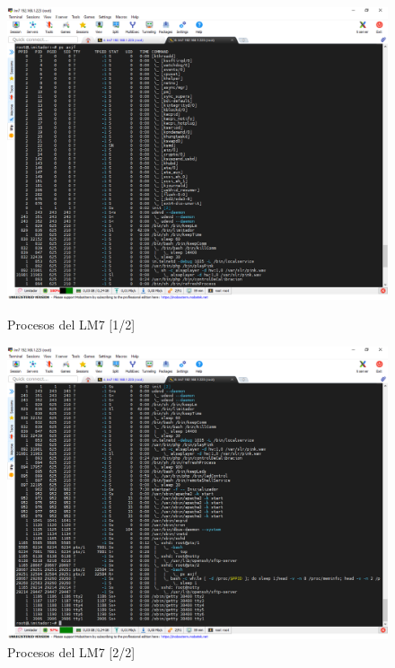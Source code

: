 \begin{figure}[ht]
    \begin{minipage}[b]{.45\textwidth}
        \centering
        \includegraphics[width=1\textwidth]{imagenes/lm7_ps[1].png}
        \caption{Procesos del LM7 [1/2]}
        \label{img:lms_ps1}
    \end{minipage}
    \hfill
    \begin{minipage}[b]{.45\textwidth}
        \centering
        \includegraphics[width=1\textwidth]{imagenes/lm7_ps[2].png}
        \caption{Procesos del LM7 [2/2]}
        \label{img:lms_ps2}
    \end{minipage}
\end{figure}

